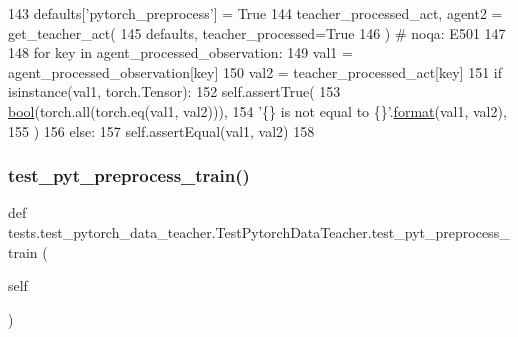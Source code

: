 \begin{DoxyCode}
143             defaults[\textcolor{stringliteral}{'pytorch\_preprocess'}] = \textcolor{keyword}{True}
144             teacher\_processed\_act, agent2 = get\_teacher\_act(
145                 defaults, teacher\_processed=\textcolor{keyword}{True}
146             )  \textcolor{comment}{# noqa: E501}
147 
148         \textcolor{keywordflow}{for} key \textcolor{keywordflow}{in} agent\_processed\_observation:
149             val1 = agent\_processed\_observation[key]
150             val2 = teacher\_processed\_act[key]
151             \textcolor{keywordflow}{if} isinstance(val1, torch.Tensor):
152                 self.assertTrue(
153                     \hyperlink{namespaceprojects_1_1mastering__the__dungeon_1_1mturk_1_1tasks_1_1MTD_1_1run_a6fc0c9b519a36f82b65bcd398f1fbb9d}{bool}(torch.all(torch.eq(val1, val2))),
154                     \textcolor{stringliteral}{'\{\} is not equal to \{\}'}.\hyperlink{namespaceparlai_1_1chat__service_1_1services_1_1messenger_1_1shared__utils_a32e2e2022b824fbaf80c747160b52a76}{format}(val1, val2),
155                 )
156             \textcolor{keywordflow}{else}:
157                 self.assertEqual(val1, val2)
158 
\end{DoxyCode}
\mbox{\label{classtests_1_1test__pytorch__data__teacher_1_1TestPytorchDataTeacher_a3ba46374c7e9068827af1b90f35c832e}} 
\subsubsection{\texorpdfstring{test\+\_\+pyt\+\_\+preprocess\+\_\+train()}{test\_pyt\_preprocess\_train()}}
{\footnotesize\ttfamily def tests.\+test\+\_\+pytorch\+\_\+data\+\_\+teacher.\+Test\+Pytorch\+Data\+Teacher.\+test\+\_\+pyt\+\_\+preprocess\+\_\+train (\begin{DoxyParamCaption}\item[{}]{self }\end{DoxyParamCaption})}

